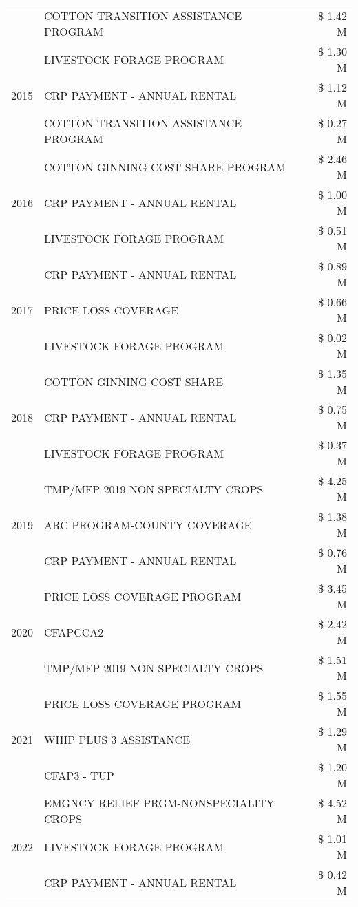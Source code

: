 \begin{tabular}{llr}
 & COTTON TRANSITION ASSISTANCE PROGRAM & \$ 1.42 M \\
\cline{1-3}
\multirow[t]{3}{*}{2015} & LIVESTOCK FORAGE PROGRAM & \$ 1.30 M \\
 & CRP PAYMENT - ANNUAL RENTAL & \$ 1.12 M \\
 & COTTON TRANSITION ASSISTANCE PROGRAM & \$ 0.27 M \\
\cline{1-3}
\multirow[t]{3}{*}{2016} & COTTON GINNING COST SHARE PROGRAM & \$ 2.46 M \\
 & CRP PAYMENT - ANNUAL RENTAL & \$ 1.00 M \\
 & LIVESTOCK FORAGE PROGRAM & \$ 0.51 M \\
\cline{1-3}
\multirow[t]{3}{*}{2017} & CRP PAYMENT - ANNUAL RENTAL & \$ 0.89 M \\
 & PRICE LOSS COVERAGE & \$ 0.66 M \\
 & LIVESTOCK FORAGE PROGRAM & \$ 0.02 M \\
\cline{1-3}
\multirow[t]{3}{*}{2018} & COTTON GINNING COST SHARE & \$ 1.35 M \\
 & CRP PAYMENT - ANNUAL RENTAL & \$ 0.75 M \\
 & LIVESTOCK FORAGE PROGRAM & \$ 0.37 M \\
\cline{1-3}
\multirow[t]{3}{*}{2019} & TMP/MFP 2019 NON SPECIALTY CROPS & \$ 4.25 M \\
 & ARC PROGRAM-COUNTY COVERAGE & \$ 1.38 M \\
 & CRP PAYMENT - ANNUAL RENTAL & \$ 0.76 M \\
\cline{1-3}
\multirow[t]{3}{*}{2020} & PRICE LOSS COVERAGE PROGRAM & \$ 3.45 M \\
 & CFAPCCA2 & \$ 2.42 M \\
 & TMP/MFP 2019 NON SPECIALTY CROPS & \$ 1.51 M \\
\cline{1-3}
\multirow[t]{3}{*}{2021} & PRICE LOSS COVERAGE PROGRAM & \$ 1.55 M \\
 & WHIP PLUS 3 ASSISTANCE & \$ 1.29 M \\
 & CFAP3 - TUP & \$ 1.20 M \\
\cline{1-3}
\multirow[t]{3}{*}{2022} & EMGNCY RELIEF PRGM-NONSPECIALITY CROPS & \$ 4.52 M \\
 & LIVESTOCK FORAGE PROGRAM & \$ 1.01 M \\
 & CRP PAYMENT - ANNUAL RENTAL & \$ 0.42 M \\
\cline{1-3}
\bottomrule
\end{tabular}
